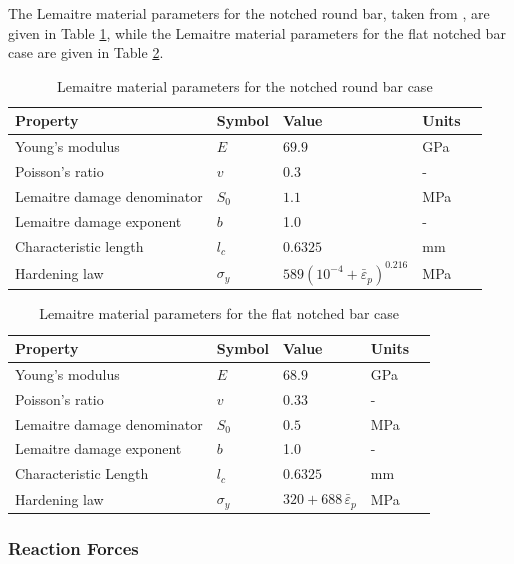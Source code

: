 \documentclass[sn-mathphys,Numbered,draft]{sn-jnl}%
\begin{document}
The Lemaitre material parameters for the notched round bar, taken from \citet{cesar_de_sa_damage_2006}, are given in Table \ref{table:NRB_material_properties_lemaitre}, while the Lemaitre material parameters for the flat notched bar case are given in Table \ref{table:FNB_material_properties_lemaitre}.
\begin{table}[htb]
	\centering
		\begin{tabular}{lllll} \hline
			Property & Symbol & Value & Units \\ \hline 
			Young's modulus & $E$ & $69.9$ & GPa \\
			Poisson's ratio & $v$ & $0.3$  & - \\
			Lemaitre damage denominator & $S_0$ & $1.1$ & MPa  \\
			Lemaitre damage exponent & $b$ & 1.0 & - \\
			Characteristic length & $l_c$ & $0.6325$ & mm  \\
			Hardening law & $\sigma_y$ & $589({10^{-4} +\bar{\varepsilon}}_p)^{0.216}$ & MPa \\
			\hline
		\end{tabular}
	\caption{Lemaitre material parameters for the notched round bar case}
	\label{table:NRB_material_properties_lemaitre}
\end{table}
\begin{table}[htb]
	\centering
		\begin{tabular}{lllll} \hline
			Property & Symbol & Value & Units  \\ \hline 
			Young's modulus & $E$ & $68.9$ & GPa \\
			Poisson's ratio & $v$ & $0.33$  & - \\
			Lemaitre damage denominator & $S_0$ & $0.5$ & MPa  \\
			Lemaitre damage exponent & $b$ & 1.0 & -  \\
			Characteristic Length & $l_c$ & $0.6325$ & mm  \\
			Hardening law & $\sigma_y$ & $320+688 \, \bar{\varepsilon}_p$ & MPa \\
			\hline
		\end{tabular}
	\caption{Lemaitre material parameters for the flat notched bar case}
	\label{table:FNB_material_properties_lemaitre}
\end{table}


\subsubsection{Reaction Forces}
\end{document}
